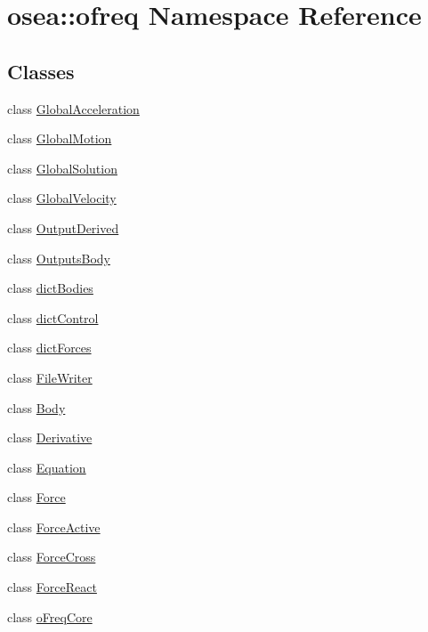 \hypertarget{namespaceosea_1_1ofreq}{\section{osea\-:\-:ofreq Namespace Reference}
\label{namespaceosea_1_1ofreq}
}
\subsection*{Classes}
\begin{DoxyCompactItemize}
\item 
class \hyperlink{classosea_1_1ofreq_1_1_global_acceleration}{Global\-Acceleration}
\item 
class \hyperlink{classosea_1_1ofreq_1_1_global_motion}{Global\-Motion}
\item 
class \hyperlink{classosea_1_1ofreq_1_1_global_solution}{Global\-Solution}
\item 
class \hyperlink{classosea_1_1ofreq_1_1_global_velocity}{Global\-Velocity}
\item 
class \hyperlink{classosea_1_1ofreq_1_1_output_derived}{Output\-Derived}
\item 
class \hyperlink{classosea_1_1ofreq_1_1_outputs_body}{Outputs\-Body}
\item 
class \hyperlink{classosea_1_1ofreq_1_1dict_bodies}{dict\-Bodies}
\item 
class \hyperlink{classosea_1_1ofreq_1_1dict_control}{dict\-Control}
\item 
class \hyperlink{classosea_1_1ofreq_1_1dict_forces}{dict\-Forces}
\item 
class \hyperlink{classosea_1_1ofreq_1_1_file_writer}{File\-Writer}
\item 
class \hyperlink{classosea_1_1ofreq_1_1_body}{Body}
\item 
class \hyperlink{classosea_1_1ofreq_1_1_derivative}{Derivative}
\item 
class \hyperlink{classosea_1_1ofreq_1_1_equation}{Equation}
\item 
class \hyperlink{classosea_1_1ofreq_1_1_force}{Force}
\item 
class \hyperlink{classosea_1_1ofreq_1_1_force_active}{Force\-Active}
\item 
class \hyperlink{classosea_1_1ofreq_1_1_force_cross}{Force\-Cross}
\item 
class \hyperlink{classosea_1_1ofreq_1_1_force_react}{Force\-React}
\item 
class \hyperlink{classosea_1_1ofreq_1_1o_freq_core}{o\-Freq\-Core}

\end{DoxyCompactItemize}
